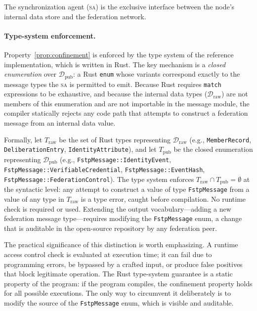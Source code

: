 \documentclass[12pt]{article}
\newcommand{\Draw}{\mathcal{D}_{\text{raw}}}
\newcommand{\Dpub}{\mathcal{D}_{\text{pub}}}
\newcommand{\SA}{\textsc{sa}}
\begin{document}
	The synchronization agent (\SA{}) is the exclusive interface between
	the node's internal data store and the federation network.
	
	\paragraph{Type-system enforcement.}
	\label{sec:typesystem}
	
	Property~\ref{prop:confinement} is enforced by the type system of the
	reference implementation, which is written in Rust. The key mechanism
	is a \emph{closed enumeration} over $\Dpub$: a Rust \texttt{enum}
	whose variants correspond exactly to the message types the \SA{} is
	permitted to emit. Because Rust requires \texttt{match} expressions to
	be exhaustive, and because the internal data types ($\Draw$) are not
	members of this enumeration and are not importable in the message
	module, the compiler statically rejects any code path that attempts to
	construct a federation message from an internal data value.
	
	Formally, let $T_{\text{raw}}$ be the set of Rust types representing
	$\Draw$ (e.g., \texttt{MemberRecord}, \texttt{DeliberationEntry},
	\texttt{IdentityAttribute}), and let $T_{\text{pub}}$ be the closed
	enumeration representing $\Dpub$ (e.g.,
	\texttt{FstpMessage::IdentityEvent},
	\texttt{FstpMessage::VerifiableCredential},
	\texttt{FstpMessage::EventHash},
	\texttt{FstpMessage::FederationControl}). The type system enforces
	$T_{\text{raw}} \cap T_{\text{pub}} = \emptyset$ at the syntactic
	level: any attempt to construct a value of type \texttt{FstpMessage}
	from a value of any type in $T_{\text{raw}}$ is a type error, caught
	before compilation. No runtime check is required or used. Extending
	the output vocabulary---adding a new federation message type---requires
	modifying the \texttt{FstpMessage} enum, a change that is auditable in
	the open-source repository by any federation peer.
	
	The practical significance of this distinction is worth emphasizing.
	A runtime access control check is evaluated at execution time; it can
	fail due to programming errors, be bypassed by a crafted input, or
	produce false positives that block legitimate operation. The Rust
	type-system guarantee is a static property of the program: if the
	program compiles, the confinement property holds for all possible
	executions. The only way to circumvent it deliberately is to modify
	the source of the \texttt{FstpMessage} enum, which is visible and
	auditable.
	
\end{document}
